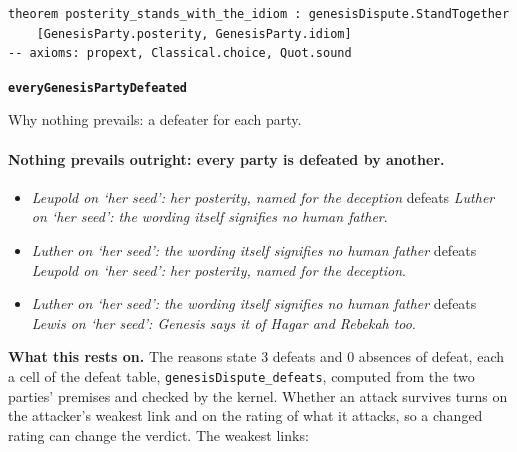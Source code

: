 \documentclass[11pt]{article}
\begin{document}
{\small\begin{verbatim}
theorem posterity_stands_with_the_idiom : genesisDispute.StandTogether
    [GenesisParty.posterity, GenesisParty.idiom]
-- axioms: propext, Classical.choice, Quot.sound
\end{verbatim}}
\par\medskip\noindent\textbf{\texttt{every\allowbreak{}Genesis\allowbreak{}Party\allowbreak{}Defeated}}\par\nobreak\noindent
Why nothing prevails: a defeater for each party.

\paragraph{Nothing prevails outright: every party is defeated by another.}
\begin{itemize}
\item \emph{Leupold on ‘her seed’: her posterity, named for the deception} defeats \emph{Luther on ‘her seed’: the wording itself signifies no human father}.
\item \emph{Luther on ‘her seed’: the wording itself signifies no human father} defeats \emph{Leupold on ‘her seed’: her posterity, named for the deception}.
\item \emph{Luther on ‘her seed’: the wording itself signifies no human father} defeats \emph{Lewis on ‘her seed’: Genesis says it of Hagar and Rebekah too}.
\end{itemize}
\par\noindent\textbf{What this rests on.} The reasons state 3 defeats and 0 absences of defeat, each a cell of the defeat table, \texttt{genesis\allowbreak{}Dispute\_\allowbreak{}defeats}, computed from the two parties' premises and checked by the kernel. Whether an attack survives turns on the attacker's weakest link and on the rating of what it attacks, so a changed rating can change the verdict. The weakest links:
\end{document}
